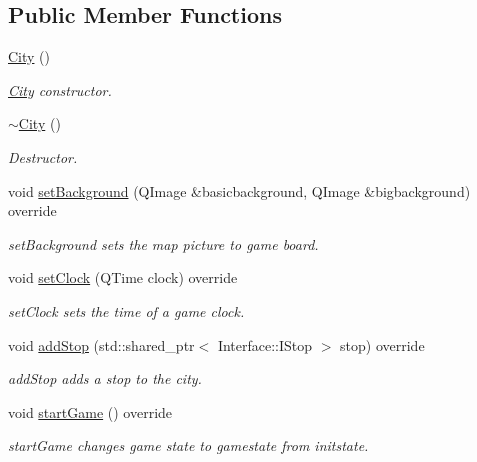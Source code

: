 \subsection*{Public Member Functions}
\begin{DoxyCompactItemize}
\item 
\hyperlink{class_student_side_1_1_city_ad5a0fd2a6e60fbd54bf0dfef0d5f849a}{City} ()
\begin{DoxyCompactList}\small\item\em \hyperlink{class_student_side_1_1_city}{City} constructor. \end{DoxyCompactList}\item 
\hyperlink{class_student_side_1_1_city_a9e98110785506a88ac9847755459988d}{$\sim$\-City} ()
\begin{DoxyCompactList}\small\item\em Destructor. \end{DoxyCompactList}\item 
void \hyperlink{class_student_side_1_1_city_a04accbc4ff8e507bc9b8cedae2444183}{set\-Background} (Q\-Image \&basicbackground, Q\-Image \&bigbackground) override
\begin{DoxyCompactList}\small\item\em set\-Background sets the map picture to game board. \end{DoxyCompactList}\item 
void \hyperlink{class_student_side_1_1_city_a7f57965f914ed8f3c544ce1324ba4fe8}{set\-Clock} (Q\-Time clock) override
\begin{DoxyCompactList}\small\item\em set\-Clock sets the time of a game clock. \end{DoxyCompactList}\item 
void \hyperlink{class_student_side_1_1_city_a54f4d302402630182a705d902c8e346a}{add\-Stop} (std\-::shared\-\_\-ptr$<$ Interface\-::\-I\-Stop $>$ stop) override
\begin{DoxyCompactList}\small\item\em add\-Stop adds a stop to the city. \end{DoxyCompactList}\item 
void \hyperlink{class_student_side_1_1_city_a10c22f1803f70837638d1f5543eb9627}{start\-Game} () override
\begin{DoxyCompactList}\small\item\em start\-Game changes game state to gamestate from initstate. \end{DoxyCompactList}\item 

\end{DoxyCompactItemize}
